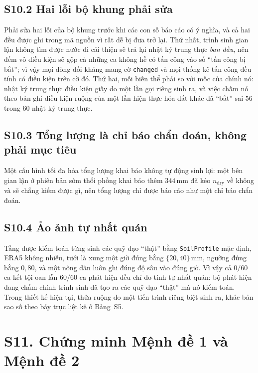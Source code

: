 \subsection*{S10.2 Hai lỗi bộ khung phải sửa}

Phải sửa hai lỗi của bộ khung trước khi các con số báo cáo có ý nghĩa, và cả hai đều được
ghi trong mã nguồn vì rất dễ bị đưa trở lại. Thứ nhất, trình sinh gian lận không tìm được
nước đi cải thiện sẽ trả lại nhật ký trung thực \emph{ban đầu}, nên đếm vô điều kiện sẽ gộp
cả những ca không hề có tấn công vào số ``tấn công bị bắt''; vì vậy mọi dòng đối kháng mang
cờ \texttt{changed} và mọi thống kê tấn công đều tính có điều kiện trên cờ đó. Thứ hai, mỗi
biến thể phải so với mốc của chính nó: nhật ký trung thực điều kiện giấy do một lần gọi
riêng sinh ra, và việc chấm nó theo bản ghi điều kiện ruộng của một lần hiện thực hóa đất
khác đã ``bắt'' sai $56$ trong $60$ nhật ký trung thực.

\subsection*{S10.3 Tổng lượng là chỉ báo chẩn đoán, không phải mục tiêu}

Một cấu hình tối đa hóa tổng lượng khai báo không tự động sinh lợi: một bên gian lận ở phiên bản sớm thổi phồng khai báo thêm $344$\,mm đã kéo $n_{\mathrm{dry}}$ về không và sẽ chẳng kiếm
được gì, nên tổng lượng chỉ được báo cáo như một chỉ báo chẩn đoán.

\subsection*{S10.4 Ảo ảnh tự nhất quán}

Tầng được kiểm toán từng sinh các quỹ đạo ``thật'' bằng \texttt{SoilProfile} mặc định, ERA5
không nhiễu, tưới là xung một giờ đúng bằng $\{20,40\}$\,mm, ngưỡng đúng bằng $0{,}80$, và
một nông dân luôn ghi đúng độ sâu vào đúng giờ. Vì vậy cả $0/60$ ca kết tội oan lẫn $60/60$
ca phát hiện đều chỉ đo tính tự nhất quán: bộ phát hiện đang chấm chính trình sinh đã tạo ra
các quỹ đạo ``thật'' mà nó kiểm toán. Trong thiết kế hiện tại, thửa ruộng do một tiến trình
riêng biệt sinh ra, khác bản sao số theo bảy trục liệt kê ở Bảng~S5.

\section*{S11. Chứng minh Mệnh đề 1 và Mệnh đề 2}

